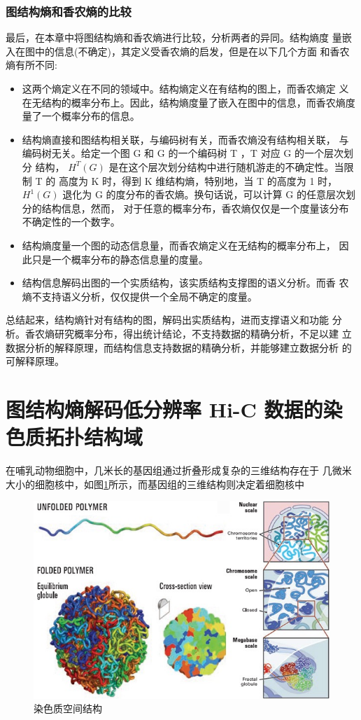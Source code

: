 \documentclass[a4paper]{apa6}
\begin{document}
\subsubsection{图结构熵和香农熵的比较}
\label{sec:org8c4e943}
最后，在本章中将图结构熵和香农熵进行比较，分析两者的异同。结构熵度 量嵌入在图中的信息(不确定)，其定义受香农熵的启发，但是在以下几个方面 和香农熵有所不同:

\begin{itemize}
\item 这两个熵定义在不同的领域中。结构熵定义在有结构的图上，而香农熵定 义在无结构的概率分布上。因此，结构熵度量了嵌入在图中的信息，而香农熵度 量了一个概率分布的信息。
\item 结构熵直接和图结构相关联，与编码树有关，而香农熵没有结构相关联， 与编码树无关。给定一个图 G 和 G 的一个编码树 T ，T 对应 G 的一个层次划分 结构， \(H^T (G)\) 是在这个层次划分结构中进行随机游走的不确定性。当限制 T 的 高度为 K 时，得到 K 维结构熵，特别地，当 T 的高度为 1 时，\(H^1(G)\) 退化为 G 的度分布的香农熵。换句话说，可以计算 G 的任意层次划分的结构信息，然而， 对于任意的概率分布，香农熵仅仅是一个度量该分布不确定性的一个数字。
\item 结构熵度量一个图的动态信息量，而香农熵定义在无结构的概率分布上， 因此只是一个概率分布的静态信息量的度量。
\item 结构信息解码出图的一个实质结构，该实质结构支撑图的语义分析。而香 农熵不支持语义分析，仅仅提供一个全局不确定的度量。
\end{itemize}

总结起来，结构熵针对有结构的图，解码出实质结构，进而支撑语义和功能 分析。香农熵研究概率分布，得出统计结论，不支持数据的精确分析，不足以建 立数据分析的解释原理，而结构信息支持数据的精确分析，并能够建立数据分析 的可解释原理。


\section{图结构熵解码低分辨率 Hi-C 数据的染色质拓扑结构域}
\label{sec:org31fc0b6}
在哺乳动物细胞中，几米长的基因组通过折叠形成复杂的三维结构存在于 几微米大小的细胞核中，如图\ref{fig:chromatin-spatial-structure}所示，而基因组的三维结构则决定着细胞核中

\begin{figure}[htbp]
\centering
\includegraphics[width=.9\linewidth]{./asset/chromatin-spatial-structure.jpg}
\caption{\label{fig:chromatin-spatial-structure}染色质空间结构}
\end{figure}
\end{document}

